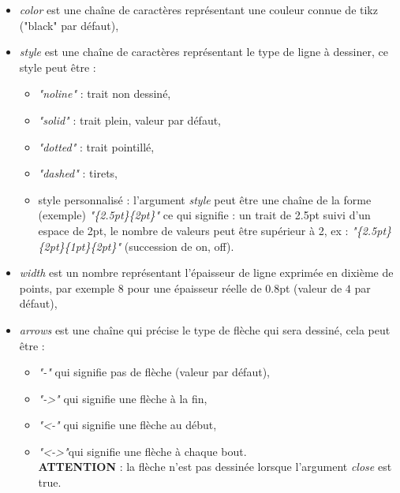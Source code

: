\documentclass[%
10pt,%
a4paper,%
french,%
]%
{article}%
\begin{document}
\begin{itemize}
\item \emph{color} est une chaîne de caractères représentant une couleur connue de tikz ("black" par défaut),
\item \emph{style} est une chaîne de caractères représentant le type de ligne à dessiner, ce style peut être :
 \begin{itemize}
  \item \emph{"noline"} : trait non dessiné,
  \item \emph{"solid"} : trait plein, valeur par défaut,
  \item \emph{"dotted"} : trait pointillé,
  \item \emph{"dashed"} : tirets,
  \item style personnalisé : l'argument \emph{style} peut être une chaîne de la forme (exemple) \emph{"\{2.5pt\}\{2pt\}"} ce qui signifie : un trait de 2.5pt suivi d'un espace de 2pt, le nombre de valeurs peut être supérieur à 2, ex : \emph{"\{2.5pt\}\{2pt\}\{1pt\}\{2pt\}"} (succession de on, off).
  \end{itemize}
\item \emph{width} est un nombre représentant l'épaisseur de ligne exprimée en dixième de points, par exemple $8$ pour une épaisseur réelle de 0.8pt (valeur de $4$ par défaut),
\item \emph{arrows} est une chaîne qui précise le type de flèche qui sera dessiné, cela peut être :
 \begin{itemize}
  \item \emph{"-"} qui signifie pas de flèche (valeur par défaut),
  \item \emph{"->"} qui signifie une flèche à la fin,
  \item \emph{"<-"} qui signifie une flèche au début,
  \item \emph{"<->"}qui signifie une flèche à chaque bout.\\
  \textbf{ATTENTION} : la flèche n'est pas dessinée lorsque l'argument \emph{close} est true.
  \end{itemize}
\end{itemize}
\end{document}
